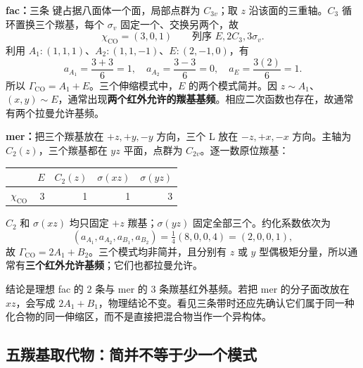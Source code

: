 \begin{worked}
\textbf{fac：}三条  键占据八面体一个面，局部点群为 $C_{3v}$；取 $z$ 沿该面的三重轴。$C_3$ 循环置换三个羰基，每个 $\sigma_v$ 固定一个、交换另两个，故
\[
\chi_{\mathrm{CO}}=(3,0,1)\qquad
\text{列序 }E,2C_3,3\sigma_v.
\]
利用 $A_1:(1,1,1)$、$A_2:(1,1,-1)$、$E:(2,-1,0)$，有
\[
a_{A_1}=\frac{3+3}{6}=1,\quad
a_{A_2}=\frac{3-3}{6}=0,\quad
a_E=\frac{3(2)}6=1.
\]
所以 $\Gamma_{\mathrm{CO}}=A_1+E$。三个伸缩模式中，$E$ 的两个模式简并。因 $z\sim A_1$、$(x,y)\sim E$，通常出现\textbf{两个红外允许的羰基基频}。相应二次函数也存在，故通常有两个拉曼允许基频。

\textbf{mer：}把三个羰基放在 $+z,+y,-y$ 方向，三个 L 放在 $-z,+x,-x$ 方向。主轴为 $C_2(z)$，三个羰基都在 $yz$ 平面，点群为 $C_{2v}$。逐一数原位羰基：
\begin{center}
\small
\begin{tabular}{lrrrr}
\toprule
 & $E$ & $C_2(z)$ & $\sigma(xz)$ & $\sigma(yz)$\\
\midrule
$\chi_{\mathrm{CO}}$ & 3 & 1 & 1 & 3\\
\bottomrule
\end{tabular}
\end{center}
$C_2$ 和 $\sigma(xz)$ 均只固定 $+z$ 羰基；$\sigma(yz)$ 固定全部三个。约化系数依次为
\[
(a_{A_1},a_{A_2},a_{B_1},a_{B_2})
=\tfrac14(8,0,0,4)=(2,0,0,1),
\]
故 $\Gamma_{\mathrm{CO}}=2A_1+B_2$。三个模式均非简并，且分别有 $z$ 或 $y$ 型偶极矩分量，所以通常有\textbf{三个红外允许基频}；它们也都拉曼允许。

结论是理想 fac 的 $2$ 条与 mer 的 $3$ 条羰基红外基频。若把 mer 的分子面改放在 $xz$，会写成 $2A_1+B_1$，物理结论不变。看见三条带时还应先确认它们属于同一种化合物的同一伸缩区，而不是直接把混合物当作一个异构体。
\end{worked}

\subsection{五羰基取代物：简并不等于少一个模式}

